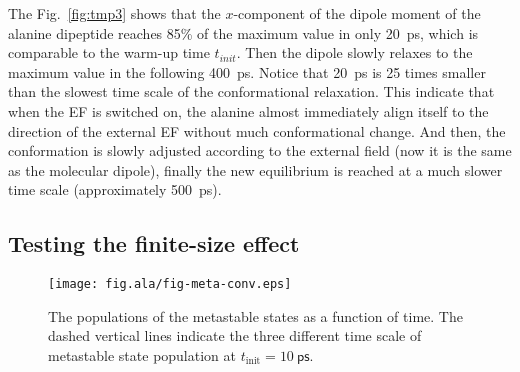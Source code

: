 \documentclass[a4paper,preprint,unsortedaddress,onecolumn]{revtex4-1}
\begin{document}
The Fig.~\ref{fig:tmp3}
shows that the $x$-component of the dipole moment of the alanine dipeptide
reaches 85\% of the maximum value in only 20~ps, which is comparable to
the warm-up time $t_{init}$. Then the dipole slowly relaxes to the 
maximum value in the following 400~ps. Notice that 20~ps is 25 times
smaller than the slowest time scale of the conformational relaxation.
This indicate that when the EF is switched on, the alanine almost immediately
align itself to the
direction of the external EF without much conformational change.
And then, the conformation is slowly adjusted according to the
external field (now it is the same as the molecular dipole),
finally  the new equilibrium is reached at a much slower time scale
(approximately 500~ps).




\subsection{Testing the finite-size effect}

\begin{figure}
  \centering
  \texttt{[image: fig.ala/fig-meta-conv.eps]}
  \caption{The populations of the metastable states as a function of time.
    The dashed vertical lines indicate the three different time scale of
  metastable state population at $t_{\textrm{init}} = 10~\textsf{ps}$.}
  \label{fig:tmp7}
\end{figure}
\end{document}
